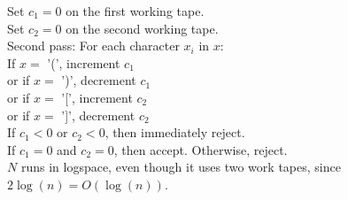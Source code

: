 \documentclass[letterpaper,notitlepage,twoside]{article}
\newcommand\tab[1][1cm]{\hspace*{#1}} %
\begin{document}
Set $c_1 = 0$ on the first working tape. \\
Set $c_2 = 0$ on the second working tape. \\
\tab Second pass: For each character $x_i$ in $x$: \\
\tab\tab If $x = $ '(', increment $c_1$ \\
\tab\tab or if $x = $ ')', decrement $c_1$ \\
\tab\tab or if $x = $ '[', increment $c_2$ \\ 
\tab\tab or if $x = $ ']', decrement $c_2$ \\
\tab\tab If $c_1 < 0$ or $c_2 < 0$, then immediately reject. \\
\tab If $c_1 = 0$ and $c_2 = 0$, then accept. Otherwise, reject. \\

$N$ runs in logspace, even though it uses two work tapes, since $2\log(n) = O(\log(n))$.
\end{document}
